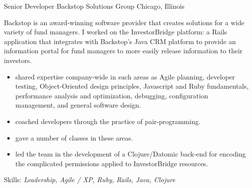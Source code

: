 \documentclass[11pt,letterpaper]{moderncv}
\begin{document}
 {Senior Developer} {Backstop Solutions Group} {Chicago, Illinois} {} {%
  Backstop is an award-winning software provider that creates solutions for a
  wide variety of fund managers.  I worked on the InvestorBridge platform: a
  Rails application that integrates with Backstop's Java CRM platform to
  provide an information portal for fund managers to more easily release
  information to their investors.
  \begin{itemize}
  \item shared expertise company-wide in such areas as Agile planning,
    developer testing, Object-Oriented design principles, Javascript
    and Ruby fundamentals, performance analysis and optimization,
    debugging, configuration management, and general software design.
  \item coached developers through the practice of pair-programming.
  \item gave a number of classes in these areas.
  \item led the team in the development of a Clojure/Datomic back-end for encoding the
    complicated permissions applied to InvestorBridge resources.
  \end{itemize}
  Skills: \emph{Leadership, Agile / XP, Ruby, Rails, Java, Clojure}
}
\end{document}

